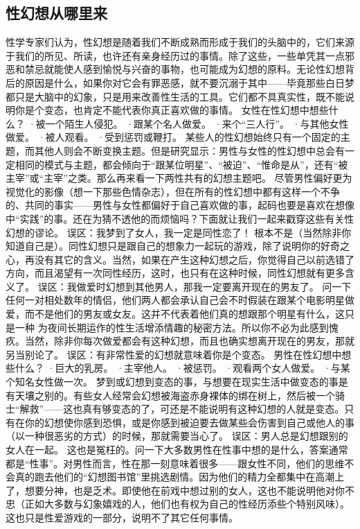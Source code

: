 \documentclass[12pt,UTF8,openany]{ctexbook}
\begin{document}
\subsection*{性幻想从哪里来}
性学专家们认为，性幻想是随着我们不断成熟而形成于我们的头脑中的，它们来源于我们的所见、所读，也许还有亲身经历过的事情。除了这些，一些单凭其一点邪恶和禁忌就能使人感到愉悦与兴奋的事物，也可能成为幻想的原料。无论性幻想背后的原因是什么，如果你对它会有罪恶感，就不要沉溺于其中——毕竟那些白日梦都只是大脑中的幻象，只是用来改善性生活的工具。它们都不具真实性，既不能说明你是个变态，也肯定不能代表你真正喜欢做的事情。
女性在性幻想中想些什么？
·被一个陌生人侵犯。
·跟某个名人做爱。
·来个“三人行”。
·与其他女性做爱。
·被人观看。
·受到惩罚或鞭打。
某些人的性幻想始终只有一个固定的主题，而其他人则会不断变换主题。但是研究显示：男性与女性的性幻想中总会有一定相同的模式与主题，都会倾向于“跟某位明星”、“被迫”、“惟命是从”，还有“被主宰”或“主宰”之类。那么再来看一下两性共有的幻想主题吧。
尽管男性偏好更为视觉化的影像（想一下那些色情杂志），但在所有的性幻想中都有这样一个不争的、共同的事实——男性与女性都偏好于自己喜欢做的事，起码也要是喜欢在想像中“实践”的事。还在为猜不透他的而烦恼吗？下面就让我们一起来戳穿这些有关性幻想的谬论。
误区：我梦到了女人，我一定是同性恋了！
根本不是（当然除非你知道自己是）。同性幻想只是跟自己的想象力一起玩的游戏，除了说明你的好奇之心，再没有其它的含义。当然，如果在产生这种幻想之后，你觉得自己以前选错了方向，而且渴望有一次同性经历，这时，也只有在这种时候，同性幻想就有更多含义了。
误区：我做爱时幻想到其他男人，那我一定要离开现在的男友了。
问一下任何一对相处数年的情侣，他们两人都会承认自己会不时假装在跟某个电影明星做爱，而不是他们的男友或女友。这并不代表着他们真的想跟那个明星有什么，这只是一种
为夜间长期运作的性生活增添情趣的秘密方法。所以你不必为此感到愧疚。当然，除非你每次做爱都会有这种幻想，而且也确实想离开现在的男友，那就另当别论了。
误区：有非常性爱的幻想就意味着你是个变态。
男性在性幻想中想些什么？
·巨大的乳房。
·主宰他人。
·被惩罚。
·观看两个女人做爱。
·与某个知名女性做一次。
梦到或幻想到变态的事，与想要在现实生活中做变态的事是有天壤之别的。有些女人经常会幻想被海盗赤身裸体的绑在树上，然后被一个骑士“解救”——这也真有够变态的了，可还是不能说明有这种幻想的人就是变态。只有在你的幻想使你感到恐惧，或是你感到被迫要去做某些会伤害到自己或他人的事（以一种很恶劣的方式）的时候，那就需要当心了。
误区：男人总是幻想跟别的女人在一起。
这也是冤枉的。问一下大多数男性在性事中想的是什么，答案通常都是“性事”。对男性而言，性在那一刻意味着很多——跟女性不同，他们的思维不会真的跑去他们的“幻想图书馆”里挑选剧情。因为他们的精力全都集中在高潮上了，想要分神，也是乏术。即使他在前戏中想过别的女人，这也不能说明他对你不忠（正如大多数与幻象嬉戏的人，他们也有权为自己的性经历添些个特别风味）。这也只是性爱游戏的一部分，说明不了其它任何事情。
\end{document}
